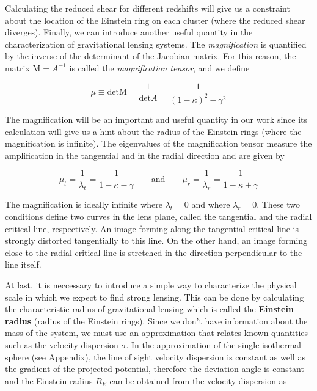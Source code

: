 Calculating the reduced shear for different redshifts will give us a constraint about the location of the Einstein ring on each cluster (where the reduced shear diverges). Finally, we can introduce another useful quantity in the characterization of gravitational lensing systems. The \textit{magnification} is quantified by the inverse of the determinant of the Jacobian matrix. For this reason, the matrix $\text{M}=A^{-1}$ is called the \textit{magnification tensor}, and we define

\begin{equation}
\mu \equiv \text{det} \text{M} = \frac{1}{\text{det}A}=\frac{1}{(1-\kappa)^2-\gamma^2}
\end{equation}

The magnification will be an important and useful quantity in our work since its calculation will give us a hint about the radius of the Einstein rings (where the magnification is infinite). The eigenvalues of the magnification tensor measure the amplification in the tangential and in the radial direction and are given by

\begin{equation}
\mu_t = \frac{1}{\lambda_t}=\frac{1}{1-\kappa - \gamma} \qquad \text{and} \qquad  \mu_r = \frac{1}{\lambda_r}=\frac{1}{1-\kappa + \gamma}
\end{equation}

The magnification is ideally infinite where $\lambda_t=0$ and where $\lambda_r=0$. These two conditions define two curves in the lens plane, called the tangential and the radial critical line, respectively. An image forming along the tangential critical line is strongly distorted tangentially to this line. On the other hand, an image forming close to the radial critical line is stretched in the direction perpendicular to the line itself. 

At last, it is neccessary to introduce a simple way to characterize the physical scale in which we expect to find strong lensing. This can be done by calculating the characteristic radius of gravitational lensing which is called the \textbf{Einstein radius} (radius of the Einstein rings). Since we don't have information about the mass of the system, we must use an approximation that relates known quantities such as the velocity dispersion $\sigma$. In the approximation of the single isothermal sphere (see Appendix), the line of sight velocity dispersion is constant as well as the gradient of the projected potential, therefore the deviation angle is constant and the Einstein radius $R_{E}$ can be obtained from the velocity dispersion as


